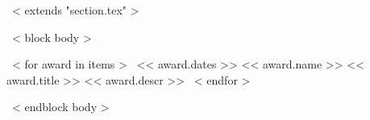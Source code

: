 ~< extends "section.tex" >~

~< block body >~
\begin{entrylistSix}
~< for award in items >~
\entrySix
{<< award.dates >>}
{<< award.name >>}
{<< award.title >>}
{<< award.descr >>}
~< endfor >~
\end{entrylistSix}
~< endblock body >~
